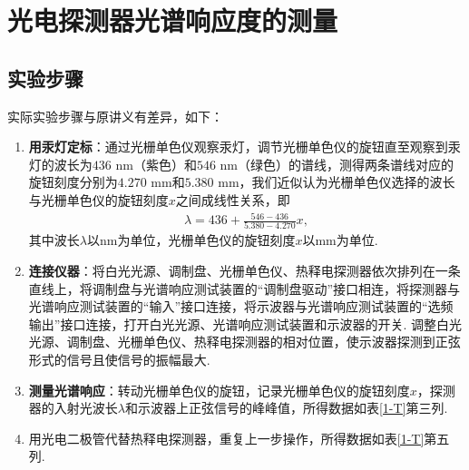 \documentclass[UTF8,10pt,a4paper]{article}
\begin{document}
\thispagestyle{FirstPageStyle}
\section{光电探测器光谱响应度的测量}
\subsection{实验步骤}
实际实验步骤与原讲义有差异，如下：
\begin{enumerate}
    \item \textbf{用汞灯定标}：通过光栅单色仪观察汞灯，调节光栅单色仪的旋钮直至观察到汞灯的波长为$436$ nm（紫色）和$546$ nm（绿色）的谱线，测得两条谱线对应的旋钮刻度分别为$4.270$ mm和$5.380$ mm，我们近似认为光栅单色仪选择的波长与光栅单色仪的旋钮刻度$x$之间成线性关系，即
    \begin{align}
        \lambda=436+\frac{546-436}{5.380-4.270}x,
    \end{align}
    其中波长$\lambda$以nm为单位，光栅单色仪的旋钮刻度$x$以mm为单位.
    \item \textbf{连接仪器}：将白光光源、调制盘、光栅单色仪、热释电探测器依次排列在一条直线上，将调制盘与光谱响应测试装置的“调制盘驱动”接口相连，将探测器与光谱响应测试装置的“输入”接口连接，将示波器与光谱响应测试装置的“选频输出”接口连接，打开白光光源、光谱响应测试装置和示波器的开关. 调整白光光源、调制盘、光栅单色仪、热释电探测器的相对位置，使示波器探测到正弦形式的信号且使信号的振幅最大.
    \item \textbf{测量光谱响应}：转动光栅单色仪的旋钮，记录光栅单色仪的旋钮刻度$x$，探测器的入射光波长$\lambda$和示波器上正弦信号的峰峰值，所得数据如表\ref{1-T}第三列.
    \item 用光电二极管代替热释电探测器，重复上一步操作，所得数据如表\ref{1-T}第五列.
\end{enumerate}
\end{document}
